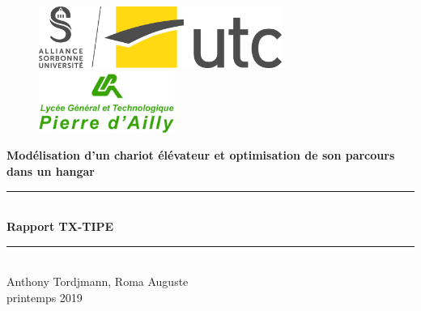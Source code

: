 \documentclass{report-UTC}
\begin{document}
\thispagestyle{empty}

\begin{figure}[h]
\centering
\includegraphics[height=2cm]{assets/logo_utc.jpg}
	\hspace{1cm}
\includegraphics[height=2cm]{assets/logo_dailly.png}
\end{figure}

\vspace{1.5cm}

\begin{center}
\huge{\textbf{Modélisation d'un chariot élévateur et optimisation de son parcours dans un hangar}} \\
\vspace{1cm}
\noindent\rule{10cm}{0.4pt} \\
\vspace{0.5cm}
\huge{\textbf{Rapport TX-TIPE}} \\
\vspace{0.5cm}
\noindent\rule{10cm}{0.4pt}  \\
\vspace{2cm}
\Large{Anthony Tordjmann, Roma Auguste} \\
\vspace{1.5cm}
\Large{printemps 2019}
\end{center}

\renewcommand*\contentsname{Sommaire}

\clearpage

\tableofcontents\thispagestyle{empty}

\clearpage

\clearpage

\clearpage

\clearpage

\clearpage

\clearpage
\printbibliography 
\end{document}
